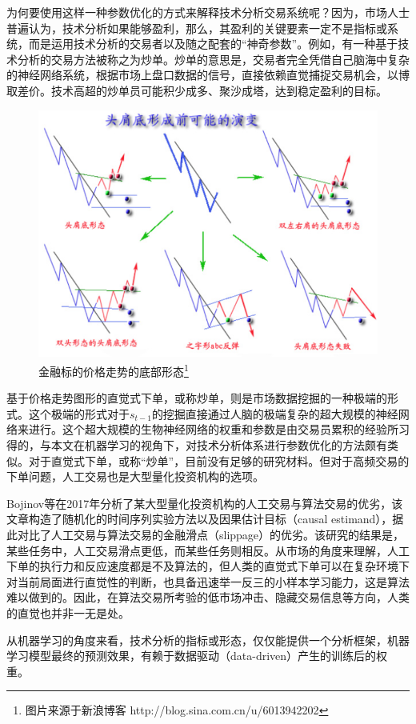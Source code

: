 \documentclass[twoside,longtitle]{LZUthesis}
\begin{document}
为何要使用这样一种参数优化的方式来解释技术分析交易系统呢？因为，市场人士普遍认为，技术分析如果能够盈利，那么，其盈利的关键要素一定不是指标或系统，而是运用技术分析的交易者以及随之配套的“神奇参数”。例如，有一种基于技术分析的交易方法被称之为炒单。炒单的意思是，交易者完全凭借自己脑海中复杂的神经网络系统，根据市场上盘口数据的信号，直接依赖直觉捕捉交易机会，以博取差价。技术高超的炒单员可能积少成多、聚沙成塔，达到稳定盈利的目标。\\
\begin{figure}
	\centering
	\includegraphics[width=0.7\linewidth]{figures/ta-1.png}
	\caption{金融标的价格走势的底部形态\footnote{图片来源于新浪博客 http://blog.sina.com.cn/u/6013942202}}
	\label{fig:ta-1}
\end{figure}
基于价格走势图形的直觉式下单，或称炒单，则是市场数据挖掘的一种极端的形式。这个极端的形式对于$s_{t-1}$的挖掘直接通过人脑的极端复杂的超大规模的神经网络来进行。这个超大规模的生物神经网络的权重和参数是由交易员累积的经验所习得的，与本文在机器学习的视角下，对技术分析体系进行参数优化的方法颇有类似。对于直觉式下单，或称“炒单”，目前没有足够的研究材料。但对于高频交易的下单问题，人工交易也是大型量化投资机构的选项。

Bojinov等在2017年分析了某大型量化投资机构的人工交易与算法交易的优劣，该文章构造了随机化的时间序列实验方法以及因果估计目标（causal estimand），据此对比了人工交易与算法交易的金融滑点（slippage）的优劣\cite{Iavor2019Time}。该研究的结果是，某些任务中，人工交易滑点更低，而某些任务则相反。从市场的角度来理解，人工下单的执行力和反应速度都是不及算法的，但人类的直觉式下单可以在复杂环境下对当前局面进行直觉性的判断，也具备迅速举一反三的小样本学习能力，这是算法难以做到的。因此，在算法交易所考验的低市场冲击、隐藏交易信息等方向，人类的直觉也并非一无是处。

从机器学习的角度来看，技术分析的指标或形态，仅仅能提供一个分析框架，机器学习模型最终的预测效果，有赖于数据驱动（data-driven）产生的训练后的权重。
\end{document}
